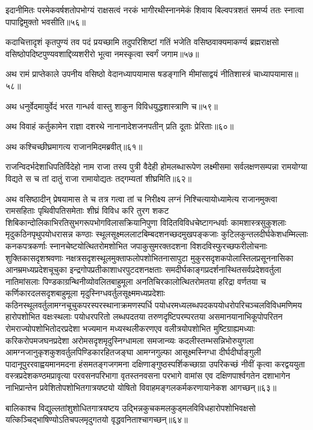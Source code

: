 \begin{flushleft}
इदानीमितः परमेकवर्षशतोपभोग्यं राक्षसत्वं नरकं भागीरथीस्नानमेकं शिवाय बिल्वपत्रशतं समर्प्य ततः स्नात्वा पापाद्विमुक्तो भवसीति॥५६॥

कदाचित्तादृशं कृतपुण्यं तव पदं प्रयच्छामि तदुपरिशिष्टां गतिं भजेति वसिष्ठवाक्यमाकर्ण्य ब्रह्मराक्षसो वसिष्ठोपदिष्टपुण्यवशाद्दिव्यशरीरो भूत्वा नमस्कृत्वा स्वर्गं जगाम॥५७॥

अथ रामं प्राप्तेकाले उपनीय वसिष्ठो वेदानध्यापयामास षडङ्गानि मीमांसाद्वयं नीतिशास्त्रं चाध्यापयामास॥५८॥

अथ धनुर्वेदमायुर्वेदं भरत गान्धर्व वास्तु शाकुन विविधयुद्धशास्त्राणि च॥५९॥

अथ विवाहं कर्तुकामेन राज्ञा दशरथे नानानादेशजनपतीन् प्रति दूताः प्रेरिताः॥६०॥

अथ कश्चिच्छीघ्रमागत्य राजानमिदमब्रवीत्॥६१॥

राजन्विदर्भदेशाधिपतिर्विदेहो नाम राजा तस्य पुत्री वैदेही होमलब्धारूपेण लक्ष्मीसमा सर्वलक्षणसम्पन्ना रामयोग्या विद्यते स च तां दातुं राजा रामायोद्यतः तद्गम्यतां शीघ्रमिति॥६२॥

अथ वसिष्ठादीन् प्रेषयामास ते च तत्र गत्वा तां च निरीक्ष्य लग्नं निश्चित्यायोध्यामेत्य राजानमुक्त्वा रामसहिताः पृथिवीपतिसमेताः शीघ्रं विविध करि तुरग शकट शिबिकान्दोलिकाभिरतिसुभगरूपभोगविलासक्रियानिपुणा विदितविविधचेष्टागन्धर्वाः कामशास्त्रसुकुशलाः मृदुकठिनपृथुपयोधरासन्न कण्ठाः स्थूलसूक्ष्मललाटबिम्बदशनच्छदमुखपङ्कजाः कुटिलकुन्तलदीर्घकेशधम्मिल्लाः कनकपत्रकर्णाः स्नानचेष्टयोत्थितरोमशोभित जपाकुसुमरक्तदशना विशदविस्फुरच्छफरीलोचनाः शुक्तिकासदृशश्रवणाः नक्षत्रसदृशस्थूलमुक्ताफलोपशोभितनासापुटा मुकुरसदृशकपोलास्तिलप्रसूननासिका आनम्रमध्यप्रदेशचूचुका इन्द्रगोपप्रतीकाशाधरपुटदशनक्षताः समदीर्घकाङ्गप्रदर्शनास्थितसर्वप्रदेशवर्तुला नातिमांसलाः पिण्डकाग्रन्थिनीव्योवलितबाहुमूला अनतिचिरकालोत्थितरोमतया हरिद्रा वर्णतया च कर्णिकारदलसदृशबाहुमूला मृदुस्निग्धवर्तुलसूक्ष्ममध्यप्रदेशाः कठिनस्थूलवर्तुलामग्नचूचुकपरस्परस्थानाक्रमणस्पर्धि पयोधरमध्यलब्धपदकपयोधरोपरिचञ्चलविविधमणिमय हारोपशोभित वक्षःस्थलाः पयोधरपरितो लब्धपदतया तरुणदृष्टिपरम्परतया असमानयानाभिकूपोपरितन रोमराज्योपशोभितोदरप्रदेशा भज्यमान मध्यस्थलीकरणएव वलीत्रयोपशोभित मुष्टिग्राह्यमध्याः करिकरोपमजघनप्रदेशा अरोमसदृशमृदुस्निग्धामला समजान्व्यः कदलीस्तम्भसन्निभोरुयुगला आमग्नजानुकृशकुशवर्तुलपिण्डिकारहितजङ्घा आमग्नगुल्फा आसूक्ष्मस्निग्धा दीर्घदीर्घाङ्गुली पादानूपुररवाह्वयमानमदना हंसमतङ्गजगमना दक्षिणाङ्गुष्ठस्पर्शिकच्छाग्रा उपरिकच्छं नीवीं कृत्वा करद्वययुता वस्त्रप्रदेशकण्ठमप्रावृत्या परवसनपरिभागा वृतस्तनवसना परभागे वामांस एव दक्षिणपार्श्वगतेन दशाभागेन नाभिप्रान्तेन प्रवेशितोपशोभितगात्रयष्टयो योषितो विवाहमङ्गलकर्मकरणायानेकश आगच्छन्॥६३॥

बालिकाश्च विद्युल्लतांशुशोधितगात्रयष्टय उद्भिन्नकुचकमलकुड्मलविविधहारोपशोभिवक्षसो यत्किञ्चिद्भाषिण्योऽतिचपलमृदुगतयो वृद्धवनिताश्चागच्छन्॥६४॥


\end{flushleft}

